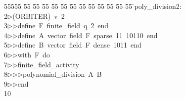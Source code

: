 %
%
\begin{tabbing}
55555 \= 55 \= 55 \= 55 \= 55 \= 55 \= 55 \= 55 \= 55 \= 55 \= 55 \= 55 \= 55 \= \>poly\_division2:\\[0pt]
2\>$\triangleright$\>(ORBITER)\ v\ 2\ \\[0pt]
3\>$\triangleright$\>$\triangleright$\>define\ F\ finite\_field\ q\ 2\ end\ \\[0pt]
4\>$\triangleright$\>$\triangleright$\>define\ A\ vector\ field\ F\ sparse\ 11\ 10110\ end\ \\[0pt]
5\>$\triangleright$\>$\triangleright$\>define\ B\ vector\ field\ F\ dense\ 1011\ end\ \\[0pt]
6\>$\triangleright$\>$\triangleright$\>with\ F\ do\ \\[0pt]
7\>$\triangleright$\>$\triangleright$\>finite\_field\_activity\ \\[0pt]
8\>$\triangleright$\>$\triangleright$\>$\triangleright$\>polynomial\_division\ A\ B\ \\[0pt]
9\>$\triangleright$\>$\triangleright$\>end\\[0pt]
10\>\end{tabbing}

